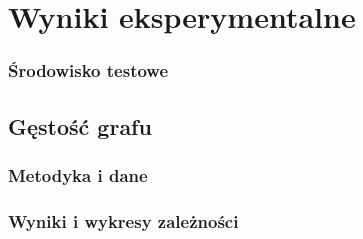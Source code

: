 \chapter{Wyniki eksperymentalne}
\thispagestyle{chapterBeginStyle}



\subsection{Środowisko testowe}



\section{Gęstość grafu}



\subsection{Metodyka i dane}




\subsection{Wyniki i wykresy zależności}

